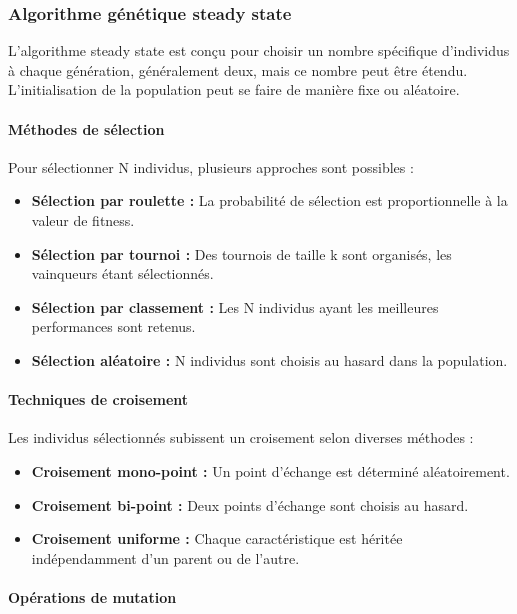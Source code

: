\documentclass{article}
\begin{document}
\subsubsection{Algorithme génétique steady state}
L'algorithme steady state est conçu pour choisir un nombre spécifique d'individus à chaque génération, généralement deux, mais ce nombre peut être étendu. L'initialisation de la population peut se faire de manière fixe ou aléatoire.

\paragraph{Méthodes de sélection}

Pour sélectionner N individus, plusieurs approches sont possibles :

\begin{itemize}
    \item \textbf{Sélection par roulette :} La probabilité de sélection est proportionnelle à la valeur de fitness.
    \item \textbf{Sélection par tournoi :} Des tournois de taille k sont organisés, les vainqueurs étant sélectionnés.
    \item \textbf{Sélection par classement :} Les N individus ayant les meilleures performances sont retenus.
    \item \textbf{Sélection aléatoire :} N individus sont choisis au hasard dans la population.
\end{itemize}

\paragraph{Techniques de croisement}

Les individus sélectionnés subissent un croisement selon diverses méthodes :

\begin{itemize}
    \item \textbf{Croisement mono-point :} Un point d'échange est déterminé aléatoirement.
    \item \textbf{Croisement bi-point :} Deux points d'échange sont choisis au hasard.
    \item \textbf{Croisement uniforme :} Chaque caractéristique est héritée indépendamment d'un parent ou de l'autre.
\end{itemize}

\paragraph{Opérations de mutation}
\end{document}
